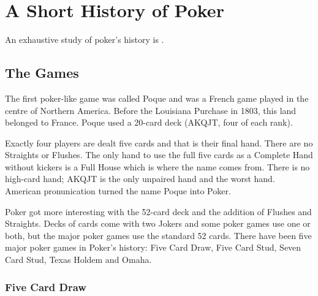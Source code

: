 \chapter{A Short History of Poker}

An exhaustive study of poker's history is \citet{McManus}.

\section{The Games}

The first poker-like game was called Poque and was a French game
played in the centre of Northern America. Before the Louisiana
Purchase in 1803, this land belonged to France. Poque used a 20-card
deck (AKQJT, four of each rank).

Exactly four players are dealt five cards and that is their final
hand. There are no Straights or Flushes. The only hand to use
the full five cards as a Complete Hand without kickers is a Full
House which is where the name comes from. There is no high-card hand;
AKQJT is the only unpaired hand and the worst hand. American
pronunication turned the name Poque into Poker.


Poker got more interesting with the 52-card deck and the addition of
Flushes and Straights. Decks of cards come with two Jokers and some
poker games use one or both, but the major poker games use the
standard 52 cards. There have been five major poker games in Poker's
history: Five Card Draw, Five Card Stud, Seven Card Stud, Texas Holdem
and Omaha.


\subsection{Five Card Draw}

